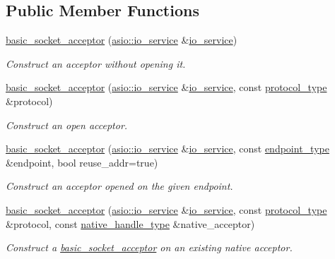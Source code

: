 \subsection*{Public Member Functions}
\begin{DoxyCompactItemize}
\item 
\hyperlink{classasio_1_1basic__socket__acceptor_a047f1b2817ee4afd097a7b42192245c0}{basic\+\_\+socket\+\_\+acceptor} (\hyperlink{classasio_1_1io__service}{asio\+::io\+\_\+service} \&\hyperlink{classasio_1_1io__service}{io\+\_\+service})
\begin{DoxyCompactList}\small\item\em Construct an acceptor without opening it. \end{DoxyCompactList}\item 
\hyperlink{classasio_1_1basic__socket__acceptor_a40486b04aa49d3aac981e9fc43b78b3b}{basic\+\_\+socket\+\_\+acceptor} (\hyperlink{classasio_1_1io__service}{asio\+::io\+\_\+service} \&\hyperlink{classasio_1_1io__service}{io\+\_\+service}, const \hyperlink{classasio_1_1basic__socket__acceptor_a38f40022b2596eb88875792bd6c0fb21}{protocol\+\_\+type} \&protocol)
\begin{DoxyCompactList}\small\item\em Construct an open acceptor. \end{DoxyCompactList}\item 
\hyperlink{classasio_1_1basic__socket__acceptor_a06923f4b125f6003af2ce051d062fcb6}{basic\+\_\+socket\+\_\+acceptor} (\hyperlink{classasio_1_1io__service}{asio\+::io\+\_\+service} \&\hyperlink{classasio_1_1io__service}{io\+\_\+service}, const \hyperlink{classasio_1_1basic__socket__acceptor_a393d69e2f8a370aaa13a9018af4c0048}{endpoint\+\_\+type} \&endpoint, bool reuse\+\_\+addr=true)
\begin{DoxyCompactList}\small\item\em Construct an acceptor opened on the given endpoint. \end{DoxyCompactList}\item 
\hyperlink{classasio_1_1basic__socket__acceptor_a12882e248649be7b41f6c6cf6e01a1eb}{basic\+\_\+socket\+\_\+acceptor} (\hyperlink{classasio_1_1io__service}{asio\+::io\+\_\+service} \&\hyperlink{classasio_1_1io__service}{io\+\_\+service}, const \hyperlink{classasio_1_1basic__socket__acceptor_a38f40022b2596eb88875792bd6c0fb21}{protocol\+\_\+type} \&protocol, const \hyperlink{classasio_1_1basic__socket__acceptor_a6b3afaaad5c55272803ad5b911a00d35}{native\+\_\+handle\+\_\+type} \&native\+\_\+acceptor)
\begin{DoxyCompactList}\small\item\em Construct a \hyperlink{classasio_1_1basic__socket__acceptor}{basic\+\_\+socket\+\_\+acceptor} on an existing native acceptor. \end{DoxyCompactList}\item 

\end{DoxyCompactItemize}

